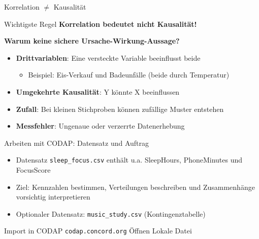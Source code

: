 \begin{frame}{Korrelation $\neq$ Kausalität}
    \begin{alertblock}{Wichtigste Regel}
        \textbf{Korrelation bedeutet nicht Kausalität!}
    \end{alertblock}

    \vspace{1em}
    \textbf{Warum keine sichere Ursache-Wirkung-Aussage?}
    \begin{itemize}[<+->]
        \item \textbf{Drittvariablen}: Eine versteckte Variable beeinflusst beide
              \begin{itemize}
                  \item Beispiel: Eis-Verkauf und Badeunfälle (beide durch Temperatur)
              \end{itemize}
        \item \textbf{Umgekehrte Kausalität}: Y könnte X beeinflussen
        \item \textbf{Zufall}: Bei kleinen Stichproben können zufällige Muster entstehen
        \item \textbf{Messfehler}: Ungenaue oder verzerrte Datenerhebung
    \end{itemize}
\end{frame}

\begin{frame}{Arbeiten mit CODAP: Datensatz und Auftrag}
    \begin{itemize}[<+->]
        \item Datensatz \texttt{sleep\_focus.csv} enthält u.a. SleepHours, PhoneMinutes und FocusScore
        \item Ziel: Kennzahlen bestimmen, Verteilungen beschreiben und Zusammenhänge vorsichtig interpretieren
        \item Optionaler Datensatz: \texttt{music\_study.csv} (Kontingenztabelle)
    \end{itemize}

    \vspace{0.8em}
    \begin{block}{Import in CODAP}
        \texttt{codap.concord.org} \rightarrow Öffnen \rightarrow Lokale Datei
    \end{block}
\end{frame}

